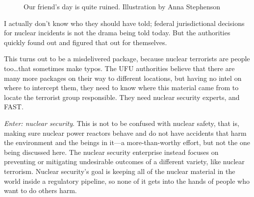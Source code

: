 {\begin{figure}[!htb]
  \centering
  \large Our friend's day is quite ruined. \small Illustration by Anna Stephenson
\end{figure}

\narr I actually don't know who they should have told; federal jurisdictional
decisions for nuclear incidents is not the drama being told today. But the
authorities quickly found out and figured that out for themselves.

\begin{shadequote} 

  This turns out to be a misdelivered package, because nuclear terrorists are
  people too\ldots that sometimes make typos. The UFU authorities believe that
  there are many more packages on their way to different locations, but having
  no intel on where to intercept them, they need to know where this material
  came from to locate the terrorist group responsible. They need nuclear
  security experts, and FAST.

\end{shadequote}

\narr \textit{Enter: nuclear security}. This is not to be confused with nuclear
safety, that is, making sure nuclear power reactors behave and do not have
accidents that harm the environment and the beings in it---a more-than-worthy
effort, but not the one being discussed here. The nuclear security enterprise
instead focuses on preventing or mitigating undesirable outcomes of a different
variety, like nuclear terrorism. Nuclear security's goal is keeping all of the
nuclear material in the world inside a regulatory pipeline, so none of it gets
into the hands of people who want to do others harm.

}
